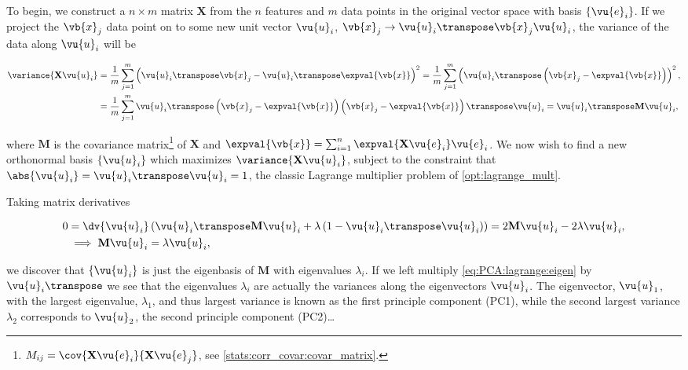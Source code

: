 To begin, we construct a $n \times m$ matrix $\mathbf{X}$
from the $n$ features and $m$ data points in the original vector space
with basis $\left\{\vu{e}_{i}\right\}$.
If we project the $\vb{x}_{j}$ data point on to
some new unit vector $\vu{u}_{i}$,
$\vb{x}_{j} \to \vu{u}_{i}\transpose \vb{x}_{j} \vu{u}_{i}$,
the variance of the data along $\vu{u}_{i}$ will be

\begin{subequations}\label{eq:PCA:variance}
\begin{align}
\variance{\mathbf{X} \vu{u}_{i}}
&= \frac{1}{m}\sum_{j=1}^{m} \left(
\vu{u}_{i}\transpose \vb{x}_{j}
-
\vu{u}_{i}\transpose \expval{\vb{x}}
\right)^{2}
= \frac{1}{m}\sum_{j=1}^{m} \left( \vu{u}_{i}\transpose \left(\vb{x}_{j} - \expval{\vb{x}}\right)\right)^{2}, \label{eq:PCA:variance:a} \\
&= \frac{1}{m}\sum_{j=1}^{m}
\vu{u}_{i}\transpose
\left(\vb{x}_{j} - \expval{\vb{x}}\right)
\left(\vb{x}_{j} - \expval{\vb{x}}\right)\transpose
\vu{u}_{i}
= \vu{u}_{i}\transpose \mathbf{M} \vu{u}_{i}, \label{eq:PCA:variance:M}
\end{align}
\end{subequations}

\noindent where $\mathbf{M}$ is
the covariance matrix\footnote{$M_{ij} = \cov{\mathbf{X} \vu{e}_{i}}{\mathbf{X} \vu{e}_{j}}$,
see \cref{stats:corr_covar:covar_matrix}.} of $\mathbf{X}$
and $\expval{\vb{x}} = \sum_{i=1}^{n} \expval{\mathbf{X} \vu{e}_{i}} \vu{e}_{i}$.
We now wish to find a new orthonormal basis $\left\{\vu{u}_{i}\right\}$
which maximizes $\variance{\mathbf{X} \vu{u}_{i}}$,
subject to the constraint that $\abs{\vu{u}_{i}} = \vu{u}_{i}\transpose \vu{u}_{i} = 1$,
\ie the classic Lagrange multiplier problem of \cref{opt:lagrange_mult}.

Taking matrix derivatives

\begin{subequations}\label{eq:PCA:lagrange}
\begin{align}
0 &= \dv{\vu{u}_{i}} \left( \vu{u}_{i}\transpose \mathbf{M} \vu{u}_{i}
+ \lambda \left( 1 - \vu{u}_{i}\transpose \vu{u}_{i} \right) \right)
= 2 \mathbf{M} \vu{u}_{i} - 2 \lambda \vu{u}_{i}, \label{eq:PCA:lagrange:setup} \\
&\implies \mathbf{M}\vu{u}_{i} = \lambda \vu{u}_{i}, \label{eq:PCA:lagrange:eigen}
\end{align}
\end{subequations}

\noindent we discover that $\left\{\vu{u}_{i}\right\}$
is just the eigenbasis of $\mathbf{M}$ with eigenvalues $\lambda_{i}$.
If we left multiply \cref{eq:PCA:lagrange:eigen} by $\vu{u}_{i}\transpose$
we see that the eigenvalues $\lambda_{i}$ are actually the variances along the eigenvectors $\vu{u}_{i}$.
The eigenvector, $\vu{u}_{1}$, with the largest eigenvalue, $\lambda_{1}$, and thus largest variance
is known as the first principle component (PC1),
while the second largest variance $\lambda_{2}$ corresponds to $\vu{u}_{2}$,
the second principle component (PC2)\ldots

